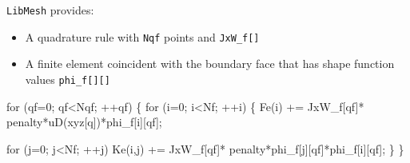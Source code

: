 \begin{frame}[fragile]
  \begin{block}{}
  \texttt{LibMesh} provides:
  \begin{itemize}
  \item {A quadrature rule with \texttt{Nqf} points and \texttt{JxW\_f[]}}
  \item {A finite element coincident with the boundary face that has %
    shape function values \texttt{phi\_f[][]}}
  \end{itemize}
  \end{block}
\small
  \begin{semiverbatim}
for (qf=0; qf<Nqf; ++qf) \{
  for (i=0; i<Nf; ++i) \{
    Fe(i) += JxW_f[qf]*
      \alert<2>{penalty}*\alert<3>{uD(xyz[q])}*phi_f[i][qf];
	
    for (j=0; j<Nf; ++j)
      Ke(i,j) += JxW_f[qf]*
        \alert<2>{penalty}*phi_f[j][qf]*phi_f[i][qf];
  \}
\}
    \end{semiverbatim}

\end{frame}
